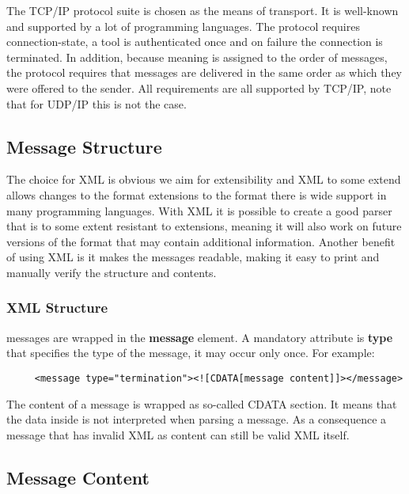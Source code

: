 \documentclass{article}
\begin{document}
   \noindent The TCP/IP protocol suite is chosen as the means of transport. It is
   well-known and supported by a lot of programming languages. The protocol
   requires connection-state, a tool is authenticated once and on failure the
   connection is terminated. In addition, because meaning is assigned to the
   order of messages, the protocol requires that messages are delivered in the
   same order as which they were offered to the sender. All requirements are
   all supported by TCP/IP, note that for UDP/IP this is not the case.

  \subsection{Message Structure}

   \noindent The choice for XML is obvious we aim for extensibility and XML to some
   extend allows changes to the format extensions to the format there is wide
   support in many programming languages. With XML it is possible to create a
   good parser that is to some extent resistant to extensions, meaning it will
   also work on future versions of the format that may contain additional
   information.  Another benefit of using XML is it makes the messages
   readable, making it easy to print and manually verify the structure and
   contents.

   \subsubsection{XML Structure}

    \noindent messages are wrapped in the \textbf{message} element. A mandatory
    attribute is \textbf{type} that specifies the type of the message, it may
    occur only once. For example:
 
    \begin{verbatim}
     <message type="termination"><![CDATA[message content]]></message>\end{verbatim}

    The content of a message is wrapped as so-called CDATA section. It means
    that the data inside is not interpreted when parsing a message. As a
    consequence a message that has invalid XML as content can still be valid
    XML itself.

  \subsection{Message Content}
\end{document}
